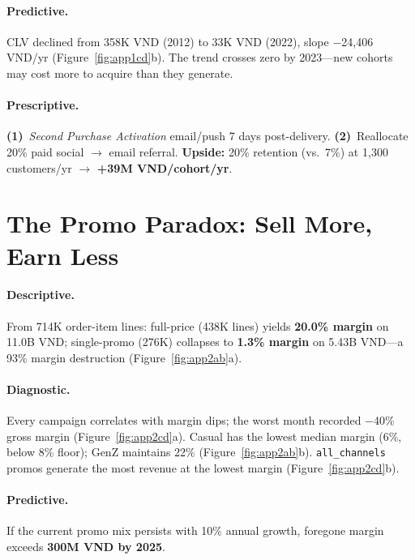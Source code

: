 \documentclass{article}
\begin{document}
\paragraph{Predictive.}
CLV declined from 358K VND (2012) to 33K VND (2022), slope $-$24{,}406 VND/yr (Figure~\ref{fig:app1cd}b). The trend crosses zero by 2023---new cohorts may cost more to acquire than they generate.

\paragraph{Prescriptive.}
\textbf{(1)}~\emph{Second Purchase Activation} email/push 7 days post-delivery. \textbf{(2)}~Reallocate 20\% paid social $\to$ email referral. \textbf{Upside:} 20\% retention (vs.\ 7\%) at 1{,}300 customers/yr $\to$ \textbf{+39M VND/cohort/yr}.

\section{The Promo Paradox: Sell More, Earn Less}
\label{sec:promo}

\paragraph{Descriptive.}
From 714K order-item lines: full-price (438K lines) yields \textbf{20.0\% margin} on 11.0B VND; single-promo (276K) collapses to \textbf{1.3\% margin} on 5.43B VND---a 93\% margin destruction (Figure~\ref{fig:app2ab}a).

\paragraph{Diagnostic.}
Every campaign correlates with margin dips; the worst month recorded $-$40\% gross margin (Figure~\ref{fig:app2cd}a). Casual has the lowest median margin (6\%, below 8\% floor); GenZ maintains 22\% (Figure~\ref{fig:app2ab}b). \texttt{all\_channels} promos generate the most revenue at the lowest margin (Figure~\ref{fig:app2cd}b).

\paragraph{Predictive.}
If the current promo mix persists with 10\% annual growth, foregone margin exceeds \textbf{300M VND by 2025}.
\end{document}
